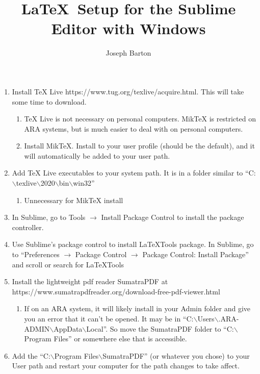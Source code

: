 \documentclass{article}
\title{\LaTeX \ Setup for the Sublime Editor with Windows}
\author{Joseph Barton}
\date{}
\begin{document}
\maketitle

\begin{enumerate}
\item Install TeX Live https://www.tug.org/texlive/acquire.html. This will take some time to download.
	\begin{enumerate}
		\item TeX Live is not necessary on personal computers. MikTeX is restricted on ARA systems, but is much easier to deal with on personal computers.
		\item Install MikTeX. Install to your user profile (should be the default), and it will automatically be added to your user path.
	\end{enumerate}

\item Add TeX Live executables to your system path. It is in a folder similar to ``C:$ \backslash $texlive$ \backslash $2020$ \backslash $bin$ \backslash $win32''
	\begin{enumerate}
		\item Unnecessary for MikTeX install
	\end{enumerate} 


\item In Sublime, go to Tools $\rightarrow$ Install Package Control to install the package controller.

\item Use Sublime's package control to install LaTeXTools package. In Sublime, go to ``Preferences $\rightarrow$ Package Control $\rightarrow$ Package Control: Install Package'' and scroll or search for LaTeXTools

\item Install the lightweight pdf reader SumatraPDF at https://www.sumatrapdfreader.org/download-free-pdf-viewer.html
	\begin{enumerate}
		\item If on an ARA system, it will likely install in your Admin folder and give you an error that it can't be opened.  It may be in ``C:$ \backslash $Users$ \backslash $.ARA-ADMIN$ \backslash $AppData$ \backslash $Local''. So move the SumatraPDF folder to ``C:$ \backslash $Program Files'' or somewhere else that is accessible.
	\end{enumerate}

\item Add the ``C:$ \backslash $Program Files$ \backslash $SumatraPDF'' (or whatever you chose) to your User path and restart your computer for the path changes to take affect.


\end{enumerate}
\end{document}
